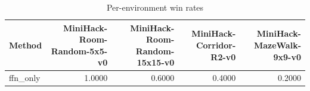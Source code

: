 \begin{table}[htbp]
\centering
\caption{Per-environment win rates}
\label{tab:per-env}
\begin{tabular}{lrrrr}
\toprule
\textbf{Method} & \textbf{MiniHack-Room-Random-5x5-v0} & \textbf{MiniHack-Room-Random-15x15-v0} & \textbf{MiniHack-Corridor-R2-v0} & \textbf{MiniHack-MazeWalk-9x9-v0} \\
\midrule
ffn\_only & 1.0000 & 0.6000 & 0.4000 & 0.2000 \\
\bottomrule
\end{tabular}
\end{table}